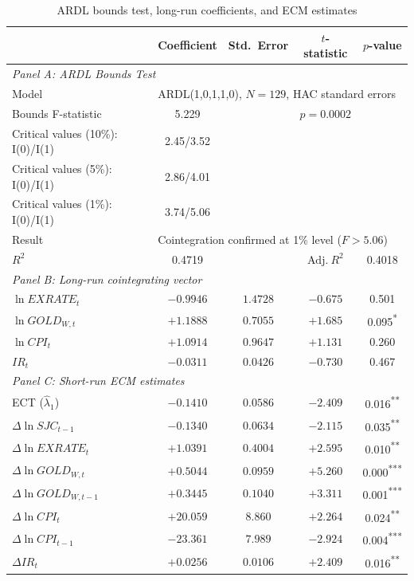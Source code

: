 \documentclass[12pt,a4paper]{article}
\newcommand{\sig}[1]{\textsuperscript{#1}}
\begin{document}
\begin{table}[H]
\caption{ARDL bounds test, long-run coefficients, and ECM estimates}
\label{tab:ardl}
\centering
\small
\begin{tabular}{lcccc}
\toprule
& Coefficient & Std.\ Error & $t$-statistic & $p$-value \\
\midrule
\multicolumn{5}{l}{\textit{Panel A: ARDL Bounds Test}} \\
Model & \multicolumn{4}{l}{ARDL(1,0,1,1,0), $N=129$, HAC standard errors} \\
Bounds F-statistic & 5.229 & & $p = 0.0002$ & \\
Critical values (10\%): I(0)/I(1) & 2.45/3.52 & & & \\
Critical values (5\%): I(0)/I(1) & 2.86/4.01 & & & \\
Critical values (1\%): I(0)/I(1) & 3.74/5.06 & & & \\
Result & \multicolumn{4}{l}{Cointegration confirmed at 1\% level ($F > 5.06$)} \\
$R^2$ & 0.4719 & & $\text{Adj.}\ R^2$ & 0.4018 \\
\midrule
\multicolumn{5}{l}{\textit{Panel B: Long-run cointegrating vector}} \\
$\ln EXRATE_t$ & $-0.9946$ & $1.4728$ & $-0.675$ & 0.501 \\
$\ln GOLD_{W,t}$ & $+1.1888$ & $0.7055$ & $+1.685$ & 0.095\sig{*} \\
$\ln CPI_t$ & $+1.0914$ & $0.9647$ & $+1.131$ & 0.260 \\
$IR_t$ & $-0.0311$ & $0.0426$ & $-0.730$ & 0.467 \\
\midrule
\multicolumn{5}{l}{\textit{Panel C: Short-run ECM estimates}} \\
ECT ($\hat{\lambda}_1$) & $-0.1410$ & $0.0586$ & $-2.409$ & 0.016\sig{**} \\
$\Delta\ln SJC_{t-1}$ & $-0.1340$ & $0.0634$ & $-2.115$ & 0.035\sig{**} \\
$\Delta\ln EXRATE_t$ & $+1.0391$ & $0.4004$ & $+2.595$ & 0.010\sig{**} \\
$\Delta\ln GOLD_{W,t}$ & $+0.5044$ & $0.0959$ & $+5.260$ & 0.000\sig{***} \\
$\Delta\ln GOLD_{W,t-1}$ & $+0.3445$ & $0.1040$ & $+3.311$ & 0.001\sig{***} \\
$\Delta\ln CPI_t$ & $+20.059$ & $8.860$ & $+2.264$ & 0.024\sig{**} \\
$\Delta\ln CPI_{t-1}$ & $-23.361$ & $7.989$ & $-2.924$ & 0.004\sig{***} \\
$\Delta IR_t$ & $+0.0256$ & $0.0106$ & $+2.409$ & 0.016\sig{**} \\

\end{tabular}
\end{table}
\end{document}

